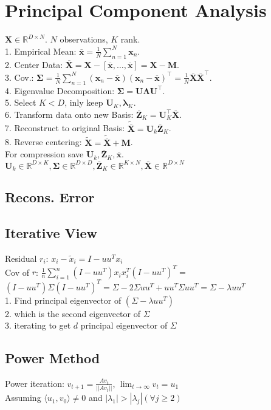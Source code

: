 \section{Principal Component Analysis}
$\mathbf{X} \in \mathbb{R}^{D \times N}$. $N$ observations, $K$ rank.\\
1. Empirical Mean: $\overline{\mathbf{x}} = \frac{1}{N} \sum_{n=1}^N \mathbf{x}_n$.\\
2. Center Data: $\overline{\mathbf{X}} = \mathbf{X} - [\overline{\mathbf{x}}, \ldots, \overline{\mathbf{x}}] = \mathbf{X} - \mathbf{M}$.\\
3. Cov.: $\boldsymbol{\Sigma} = \frac{1}{N	} \sum_{n=1}^N (\mathbf{x}_n - \overline{\mathbf{x}}) (\mathbf{x}_n - \overline{\mathbf{x}})^\top = \frac{1}{N} \overline{\mathbf{X}}\overline{\mathbf{X}}^\top$.\\
4. Eigenvalue Decomposition: $\boldsymbol{\Sigma} = \mathbf{U} \boldsymbol{\Lambda} \mathbf{U}^\top$.\\
5. Select $K < D$, inly keep $\mathbf{U}_K, \boldsymbol{\lambda}_K$.\\
6. Transform data onto new Basis: $\overline{\mathbf{Z}}_K = \mathbf{U}_K^\top \overline{\mathbf{X}}$.\\
7. Reconstruct to original Basis: $\tilde{\overline{\mathbf{X}}} = \mathbf{U}_k \overline{\mathbf{Z}}_K$.\\
8. Reverse centering: $\tilde{\mathbf{X}} = \tilde{\overline{\mathbf{X}}} + \mathbf{M}$.\\
For compression save $\mathbf{U}_k, \overline{\mathbf{Z}}_K, \overline{\mathbf{x}}$.\\
$\mathbf{U}_k \in \mathbb{R}^{D \times K}, \boldsymbol{\Sigma} \in \mathbb{R}^{D \times D}, \overline{\mathbf{Z}}_K \in \mathbb{R}^{K \times N}, \overline{\mathbf{X}} \in \mathbb{R}^{D \times N}$
\subsection*{Recons. Error}
\vspace{10mm}
\subsection*{Iterative View}
Residual $r_i$: $x_i - \tilde{x}_i = I - uu^T  x_i$\\
Cov of $r$:  $\frac{1}{n} \sum_{i=1}^n (I-uu^T)x_i x_i^T (I-uu^T)^T =$ \\
$(I-uu^T) \Sigma (I-uu^T)^T = \Sigma - 2\Sigma u u^T + u u^T \Sigma u u ^T = \Sigma - \lambda uu^T$ \\
1. Find principal eigenvector of $(\Sigma - \lambda u u^T)$\\
2. which is the second eigenvector of $\Sigma$\\
3. iterating to get $d$ principal eigenvector of $\Sigma$

\subsection*{Power Method}
Power iteration: $v_{t+1} = \frac{Av_t}{||Av_t||}$, $\lim_{t \rightarrow \infty} v_t = u_1$\\
Assuming $\langle u_1, v_0 \rangle \not = 0$ and $|\lambda_1| > |\lambda_j| (\forall j \geq 2)$
